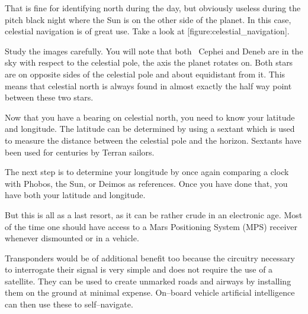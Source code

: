 That is fine for identifying north during the day, but obviously useless during the pitch black night where the Sun is on the other side of the planet. In this case, celestial navigation is of great use. Take a look at [figure:celestial_navigation].

    {}
    {}
    {}
    \stopcombination

Study the images carefully. You will note that both \alpha\ Cephei and Deneb are  in the sky with respect to the celestial pole, the axis the planet rotates on. Both stars are on opposite sides of the celestial pole and about equidistant from it. This means that celestial north is always found in almost exactly the half way point between these two stars.

Now that you have a bearing on celestial north, you need to know your latitude and longitude. The latitude can be determined by using a sextant which is used to measure the distance between the celestial pole and the horizon. Sextants have been used for centuries by Terran sailors. 

The next step is to determine your longitude by once again comparing a clock with Phobos, the Sun, or Deimos as references. Once you have done that, you have both your latitude and longitude.

But this is all as a last resort, as it can be rather crude in an electronic age. Most of the time one should have access to a Mars Positioning System (MPS) receiver whenever dismounted or in a vehicle. 

Transponders would be of additional benefit too because the circuitry necessary to interrogate their signal is very simple and does not require the use of a satellite. They can be used to create unmarked roads and airways by installing them on the ground at minimal expense. On--board vehicle artificial intelligence can then use these to self--navigate.

